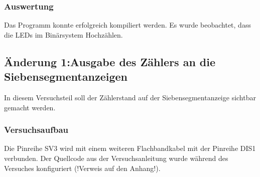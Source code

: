 \documentclass[12pt,a4paper]{article}
\begin{document}
\subsubsection*{Auswertung}
Das Programm konnte erfolgreich kompiliert werden. 
Es wurde beobachtet, dass die LEDs im Binärsystem Hochzählen.
\subsection{Änderung 1:Ausgabe des Zählers an die Siebensegmentanzeigen}
In diesem Versuchsteil soll der Zählerstand auf der Siebensegmentanzeige sichtbar gemacht werden.
\subsubsection*{Versuchsaufbau}
Die Pinreihe SV3 wird mit einem weiteren Flachbandkabel mit der Pinreihe DIS1 verbunden.
Der Quellcode aus der Versuchsanleitung wurde während des Versuches konfiguriert (!Verweis auf den Anhang!).
\end{document}
